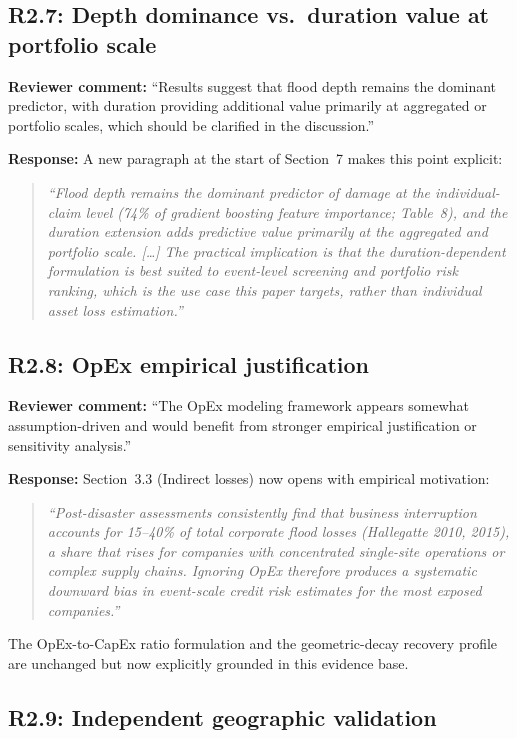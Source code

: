 \documentclass[11pt]{article}
\begin{document}
\subsection*{R2.7: Depth dominance vs.\ duration value at portfolio scale}

\textbf{Reviewer comment:} ``Results suggest that flood depth remains the dominant predictor, with duration providing additional value primarily at aggregated or portfolio scales, which should be clarified in the discussion.''

\textbf{Response:} A new paragraph at the start of Section~7 makes this point explicit:
\begin{quote}
\textit{``Flood depth remains the dominant predictor of damage at the individual-claim level (74\% of gradient boosting feature importance; Table~8), and the duration extension adds predictive value primarily at the aggregated and portfolio scale. [\ldots] The practical implication is that the duration-dependent formulation is best suited to event-level screening and portfolio risk ranking, which is the use case this paper targets, rather than individual asset loss estimation.''}
\end{quote}

\subsection*{R2.8: OpEx empirical justification}

\textbf{Reviewer comment:} ``The OpEx modeling framework appears somewhat assumption-driven and would benefit from stronger empirical justification or sensitivity analysis.''

\textbf{Response:} Section~3.3 (Indirect losses) now opens with empirical motivation:
\begin{quote}
\textit{``Post-disaster assessments consistently find that business interruption accounts for 15--40\% of total corporate flood losses (Hallegatte 2010, 2015), a share that rises for companies with concentrated single-site operations or complex supply chains. Ignoring OpEx therefore produces a systematic downward bias in event-scale credit risk estimates for the most exposed companies.''}
\end{quote}
The OpEx-to-CapEx ratio formulation and the geometric-decay recovery profile are unchanged but now explicitly grounded in this evidence base.

\subsection*{R2.9: Independent geographic validation}
\end{document}
